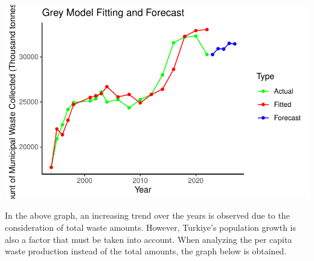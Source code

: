 \documentclass[
  11pt,
  a4paper,
  DIV=11,
  numbers=noendperiod]{scrartcl}
\begin{document}
\includegraphics{project_files/figure-pdf/unnamed-chunk-48-1.pdf}

In the above graph, an increasing trend over the years is observed due
to the consideration of total waste amounts. However, Turkiye's
population growth is also a factor that must be taken into account. When
analyzing the per capita waste production instead of the total amounts,
the graph below is obtained.
\end{document}
